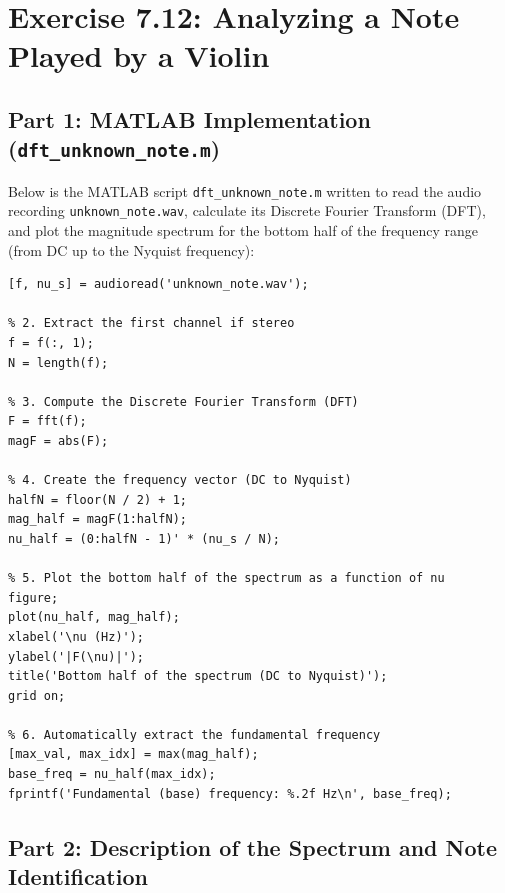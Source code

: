 
\section*{Exercise 7.12: Analyzing a Note Played by a Violin}

\subsection*{Part 1: MATLAB Implementation (\texttt{dft\_unknown\_note.m})}

Below is the MATLAB script \texttt{dft\_unknown\_note.m} written to read the audio recording \texttt{unknown\_note.wav}, calculate its Discrete Fourier Transform (DFT), and plot the magnitude spectrum for the bottom half of the frequency range (from DC up to the Nyquist frequency):

\begin{lstlisting}[caption={MATLAB script \texttt{dft\_unknown\_note.m} for spectral analysis of \texttt{unknown\_note.wav}}, label={lst:dft_unknown_note}]
% 1. Read the audio file unknown_note.wav and retrieve sampling frequency
[f, nu_s] = audioread('unknown_note.wav');

% 2. Extract the first channel if stereo
f = f(:, 1);
N = length(f);

% 3. Compute the Discrete Fourier Transform (DFT)
F = fft(f);
magF = abs(F);

% 4. Create the frequency vector (DC to Nyquist)
halfN = floor(N / 2) + 1;
mag_half = magF(1:halfN);
nu_half = (0:halfN - 1)' * (nu_s / N);

% 5. Plot the bottom half of the spectrum as a function of nu
figure;
plot(nu_half, mag_half);
xlabel('\nu (Hz)');
ylabel('|F(\nu)|');
title('Bottom half of the spectrum (DC to Nyquist)');
grid on;

% 6. Automatically extract the fundamental frequency
[max_val, max_idx] = max(mag_half);
base_freq = nu_half(max_idx);
fprintf('Fundamental (base) frequency: %.2f Hz\n', base_freq);
\end{lstlisting}

\subsection*{Part 2: Description of the Spectrum and Note Identification}

